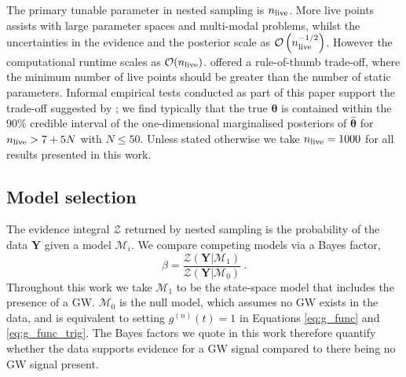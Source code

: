 \documentclass[fleqn,usenatbib,useAMS]{mnras}
\begin{document}
The primary tunable parameter in nested sampling is $n_{\rm live}$. More live points assists with large parameter spaces and multi-modal problems, whilst the uncertainties in the evidence and the posterior scale as $\mathcal{O}\left(n_{\rm live}^{-1/2}\right)$. However the computational runtime scales as $\mathcal{O}(n_{\rm live})$. \cite{Ashton2022} offered a rule-of-thumb trade-off, where the minimum number of live points should be greater than the number of static parameters. Informal empirical tests conducted as part of this paper support the trade-off suggested by \cite{Ashton2022}; we find typically that the true ${\boldsymbol{\theta}}$ is contained within the 90\% credible interval of the one-dimensional marginalised posteriors of ${\boldsymbol{\hat{\theta}}}$ for $n_{\rm live} > 7 + 5N$ with $N \leq 50$. Unless stated otherwise we take $n_{\rm live} = 1000$ for all results presented in this work. \newline 


\subsection{Model selection}\label{sec:model_selection}
The evidence integral $\mathcal{Z}$ returned by nested sampling is the probability of the data $\boldsymbol{Y}$ given a model $\mathcal{M}_i$. We compare competing models via a Bayes factor,
\begin{equation}
	\beta = \frac{\mathcal{Z}(\boldsymbol{Y} | \mathcal{M}_1)}{\mathcal{Z}(\boldsymbol{Y} | \mathcal{M}_0)} \ . \label{eq:bayes}
\end{equation}
Throughout this work we take $\mathcal{M}_1$ to be the state-space model that includes the presence of a GW. $\mathcal{M}_0$ is the null model, which assumes no GW exists in the data, and is equivalent to setting $g^{(n)}(t)=1$ in Equations \eqref{eq:g_func} and \eqref{eq:g_func_trig}. The Bayes factors we quote in this work therefore quantify whether the data supports evidence for a GW signal compared to there being no GW signal present.
\end{document}

